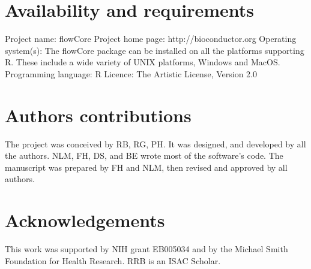 \documentclass[10pt]{bmc_article}
\newenvironment{bmcformat}{\begin{raggedright}\baselineskip20pt\sloppy\setboolean{publ}{false}}{\end{raggedright}\baselineskip20pt\sloppy}
\begin{document}
\begin{bmcformat}
\section*{Availability and requirements}
Project name: flowCore
Project home page: http://bioconductor.org 
Operating system(s): The flowCore package can be installed on all the 
platforms supporting R. These include a wide variety of UNIX platforms, Windows 
and MacOS.  
Programming language: R 
Licence: The Artistic License, Version 2.0

    
\section*{Authors contributions}
The project was conceived by RB, RG, PH. It was designed, and
developed by all the authors.  NLM, FH, DS, and BE wrote most of the
software’s code. The manuscript was prepared by FH and NLM, then
revised and approved by all authors.

    

\section*{Acknowledgements}
  This work was supported by NIH grant EB005034 and by the Michael Smith
Foundation for Health Research. RRB is an ISAC Scholar.



 


{
   }     %


\end{bmcformat}
\end{document}
